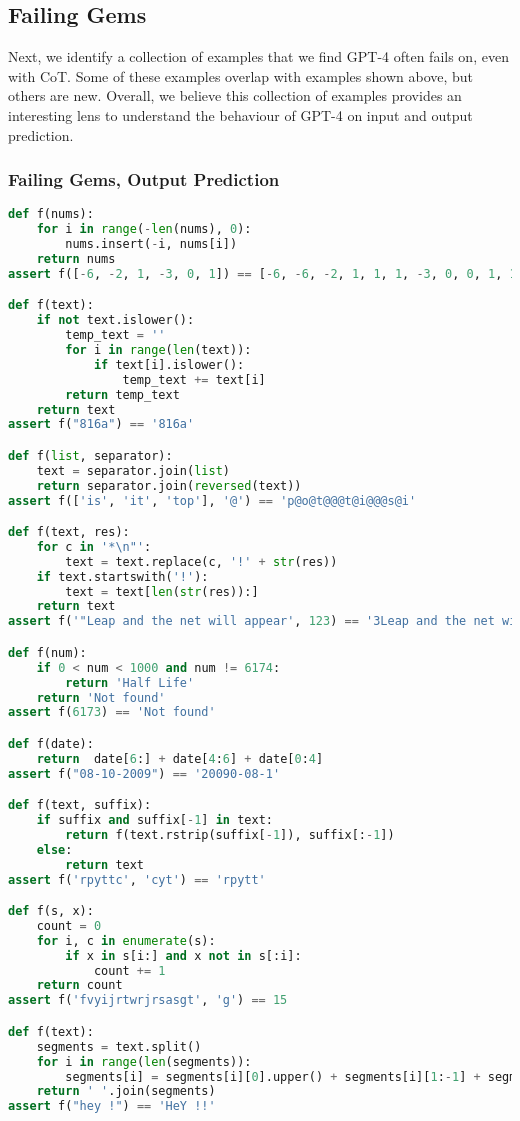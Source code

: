 \subsection{Failing Gems}
Next, we identify a collection of examples that we find GPT-4 often fails on, even with CoT. Some of these examples overlap with examples shown above, but others are new. Overall, we believe this collection of examples provides an interesting lens to understand the behaviour of GPT-4 on input and output prediction.

\subsubsection{Failing Gems, Output Prediction}
\begin{lstlisting}[breaklines=true, language=python]
def f(nums):
    for i in range(-len(nums), 0):
        nums.insert(-i, nums[i])
    return nums
assert f([-6, -2, 1, -3, 0, 1]) == [-6, -6, -2, 1, 1, 1, -3, 0, 0, 1, 1, -6]

def f(text):
    if not text.islower():
        temp_text = ''
        for i in range(len(text)):
            if text[i].islower():
                temp_text += text[i]
        return temp_text
    return text
assert f("816a") == '816a'

def f(list, separator):
    text = separator.join(list)
    return separator.join(reversed(text))
assert f(['is', 'it', 'top'], '@') == 'p@o@t@@@t@i@@@s@i'

def f(text, res):
    for c in '*\n"':
        text = text.replace(c, '!' + str(res))
    if text.startswith('!'):
        text = text[len(str(res)):]
    return text
assert f('"Leap and the net will appear', 123) == '3Leap and the net will appear'

def f(num):
    if 0 < num < 1000 and num != 6174:
        return 'Half Life'
    return 'Not found'
assert f(6173) == 'Not found'

def f(date):
    return  date[6:] + date[4:6] + date[0:4]
assert f("08-10-2009") == '20090-08-1'

def f(text, suffix):
    if suffix and suffix[-1] in text:
        return f(text.rstrip(suffix[-1]), suffix[:-1])
    else:
        return text
assert f('rpyttc', 'cyt') == 'rpytt'

def f(s, x):
    count = 0
    for i, c in enumerate(s):
        if x in s[i:] and x not in s[:i]:
            count += 1
    return count
assert f('fvyijrtwrjrsasgt', 'g') == 15

def f(text):
    segments = text.split()
    for i in range(len(segments)):
        segments[i] = segments[i][0].upper() + segments[i][1:-1] + segments[i][-1].upper()
    return ' '.join(segments)
assert f("hey !") == 'HeY !!'


\end{lstlisting}
